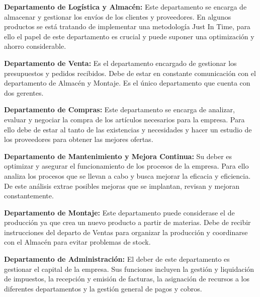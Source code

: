 \textbf{Departamento de Logística y Almacén:} Este departamento se encarga de almacenar y gestionar los envíos de los clientes y proveedores. En algunos productos se está tratando de implementar una metodología Just In Time, para ello el papel de este departamento es crucial y puede suponer una optimización y ahorro considerable.

\textbf{Departamento de Venta:} Es el departamento encargado de gestionar los presupuestos y pedidos recibidos. Debe de estar en constante comunicación con el departamento de Almacén y Montaje. Es el único departamento que cuenta con dos gerentes.

\textbf{Departamento de Compras:} Este departamento se encarga de analizar, evaluar y negociar la compra de los artículos necesarios para la empresa. Para ello debe de estar al tanto de las existencias y necesidades y hacer un estudio de los proveedores para obtener las mejores ofertas. 

\textbf{Departamento de Mantenimiento y Mejora Continua:} Su deber es optimizar y asegurar el funcionamiento de los procesos de la empresa. Para ello analiza los procesos que se llevan a cabo y busca mejorar la eficacia y eficiencia. De este análisis extrae posibles mejoras que se implantan, revisan y mejoran constantemente.

\textbf{Departamento de Montaje:} Este departamento puede considerase el de producción ya que crea un nuevo producto a partir de materias. Debe de recibir instrucciones del departo de Ventas para organizar la producción y coordinarse con el Almacén para evitar problemas de stock.

\textbf{Departamento de Administración:} El deber de este departamento es gestionar el capital de la empresa. Sus funciones incluyen la gestión y liquidación de impuestos, la recepción y emisión de facturas, la asignación de recursos a los diferentes departamentos y la gestión general de pagos y cobros. 
